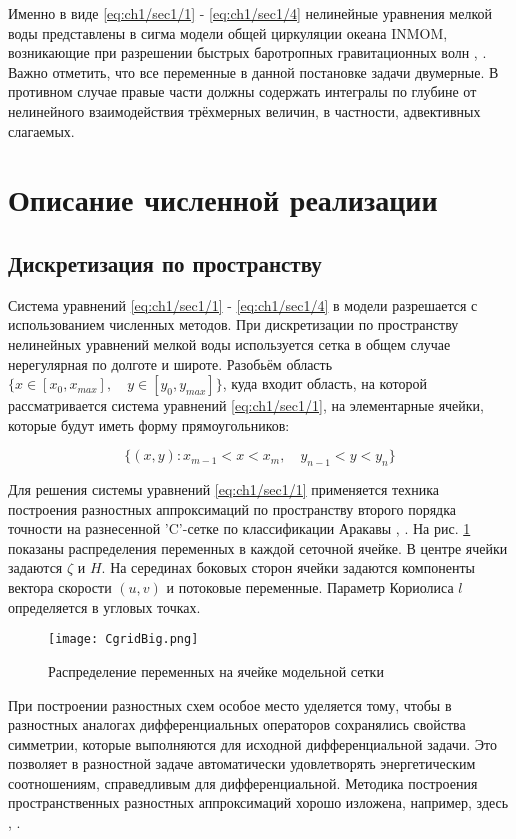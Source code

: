 Именно в виде \cref{eq:ch1/sec1/1} - \cref{eq:ch1/sec1/4} нелинейные уравнения мелкой воды представлены в сигма модели общей циркуляции океана INMOM,
возникающие при разрешении быстрых баротропных гравитационных волн \cite{INMOM}, \cite{ChaplyginSW2017}.
Важно отметить, что все переменные в данной постановке задачи двумерные.
В противном случае правые части должны содержать интегралы по глубине от нелинейного взаимодействия трёхмерных величин, в частности, адвективных слагаемых.

\section{Описание численной реализации}\label{sec:ch1/sec2}

\subsection{Дискретизация по пространству}\label{sec:ch1/sec2-1}

Система уравнений \cref{eq:ch1/sec1/1} - \cref{eq:ch1/sec1/4} в модели разрешается с использованием численных методов.
При дискретизации по пространству нелинейных уравнений мелкой воды используется сетка в общем случае нерегулярная по долготе и широте.
Разобьём область $\{ x \in [x_0, x_{max}], \quad y \in [y_0, y_{max}] \}$, куда входит область, на которой рассматривается система уравнений \cref{eq:ch1/sec1/1},
на элементарные ячейки, которые будут иметь форму прямоугольников:

$$ \{ (x, y) : x_{m-1} < x < x_{m}, \quad y_{n-1} < y < y_{n} \} $$

Для решения системы уравнений \cref{eq:ch1/sec1/1} применяется техника построения разностных аппроксимаций по пространству второго порядка точности на разнесенной
'C'-сетке по классификации Аракавы \cite{ARAKAWA1976}, \cite{ARAKAWA1977}. На рис. \cref{fig:grid} показаны распределения переменных в каждой сеточной ячейке.
В центре ячейки задаются $\zeta$ и $H$. На серединах боковых сторон ячейки задаются
компоненты вектора скорости $(u, v)$ и потоковые переменные.
Параметр Кориолиса $l$ определяется в угловых точках.

\begin{figure}[htb!]
    \center
    \texttt{[image: CgridBig.png]}
    \caption{Распределение переменных на ячейке модельной сетки}
    \label{fig:grid}
\end{figure}

При построении разностных схем особое место уделяется тому, чтобы
в разностных аналогах дифференциальных операторов сохранялись свойства симметрии,
которые выполняются для исходной дифференциальной задачи.
Это позволяет в разностной задаче автоматически удовлетворять энергетическим соотношениям, справедливым для дифференциальной.
Методика построения пространственных разностных аппроксимаций хорошо изложена, например, здесь \cite{ROUCH}, \cite{MARCHUK}.

